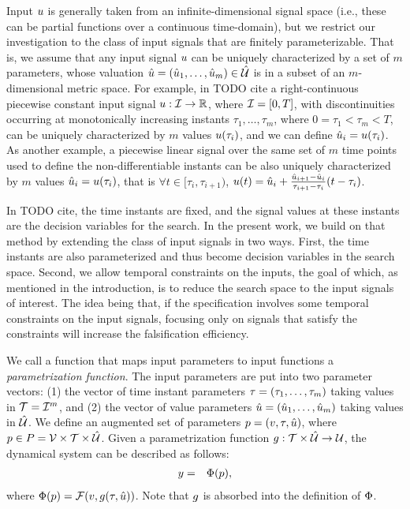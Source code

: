 Input $u$ is generally taken from an infinite-dimensional signal space (i.e., these can be partial functions over a continuous time-domain), but we restrict our investigation to the class of  input signals that are finitely parameterizable. That is, we assume that any input signal $u$ 
can be uniquely characterized by a set of $m$ parameters, whose valuation $\hat{u} =(\hat{u}_1,\ldots,\hat{u}_m) \in \hat{\mathcal{U}}$ is in a subset of an $m$-dimensional metric space. For example, in \cite{} {\color{red} TODO cite} a right-continuous piecewise constant input signal $u:\mathcal{I} \rightarrow \mathbb{R}$, where $\mathcal{I}=[ 0,T ]$, with discontinuities occurring at monotonically increasing instants $\tau_1,\ldots, \tau_m$, where $0=\tau_1<\tau_m<T$, can be uniquely characterized by $m$ values $u(\tau_i)$, and we can define $\hat{u}_i=u(\tau_i)$. As another example, a piecewise linear signal over the same set of $m$ time points used to define the non-differentiable instants can be also uniquely characterized by $m$ values $\hat{u}_i = u(\tau_i)$, that is $\forall t \in [\tau_i, \tau_{i+1})$, $u(t) = \hat{u}_i  + 
\frac{\hat{u}_{i+1} - \hat{u}_i}{\tau_{i+1} -  \tau_i}(t-\tau_i)$.

In \cite{} {\color{red} TODO cite}, the time instants are fixed, and the signal values at these instants are the decision variables for the search. In the present work, we build on that method by extending the class of input signals in two ways. First, the time instants are also parameterized and thus become decision variables in the search space. Second, we allow temporal constraints on the inputs, the goal of which, as mentioned in the introduction, is to reduce the search space to the input signals of interest. The idea being that, if the specification involves some temporal constraints on the input signals, focusing only on signals that satisfy the constraints will increase the falsification efficiency. 

We call a function that maps input parameters to input functions a {\em parametrization function}. The input parameters are put into two parameter vectors: (1) the vector of time instant parameters $\tau = (\tau_1,\ldots, \tau_m)$ taking values in $\mathcal{T}=\mathcal{I}^m$, and (2) the vector of value parameters $\hat{u}= (\hat{u}_1, \ldots, \hat{u}_m)$ taking values in $\hat{\mathcal{U}}$. We define an augmented set of parameters $p = (v, \tau, \hat{u})$, where $p \in P = \mathcal{V} \times \mathcal{T}  \times \hat{\mathcal{U}}$. Given a parametrization function $g: \mathcal{T} \times \hat{\mathcal{U}} \rightarrow \mathcal{U}$, the dynamical system can be described as follows:
\begin{eqnarray} \label{eq:behaviorfunc}
y &=& \Phi(p),
\end{eqnarray}
where $\Phi(p) = \mathcal{F} (v, g(\tau, \hat{u}))$.  Note that $g$ is absorbed into the definition of $\Phi$.

